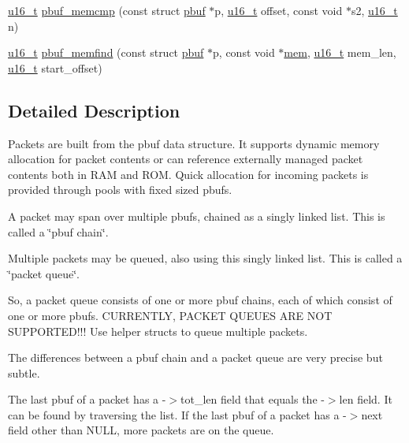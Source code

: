 \begin{DoxyCompactItemize}
\item 
\hyperlink{group__compiler__abstraction_ga77570ac4fcab86864fa1916e55676da2}{u16\+\_\+t} \hyperlink{group__pbuf_ga2170ccbbb13238380dbb203ee1b85974}{pbuf\+\_\+memcmp} (const struct \hyperlink{structpbuf}{pbuf} $\ast$p, \hyperlink{group__compiler__abstraction_ga77570ac4fcab86864fa1916e55676da2}{u16\+\_\+t} offset, const void $\ast$s2, \hyperlink{group__compiler__abstraction_ga77570ac4fcab86864fa1916e55676da2}{u16\+\_\+t} n)
\item 
\hyperlink{group__compiler__abstraction_ga77570ac4fcab86864fa1916e55676da2}{u16\+\_\+t} \hyperlink{group__pbuf_ga18c164a6e4a24d89ea9eb7571a886448}{pbuf\+\_\+memfind} (const struct \hyperlink{structpbuf}{pbuf} $\ast$p, const void $\ast$\hyperlink{structmem}{mem}, \hyperlink{group__compiler__abstraction_ga77570ac4fcab86864fa1916e55676da2}{u16\+\_\+t} mem\+\_\+len, \hyperlink{group__compiler__abstraction_ga77570ac4fcab86864fa1916e55676da2}{u16\+\_\+t} start\+\_\+offset)
\end{DoxyCompactItemize}


\subsection{Detailed Description}
Packets are built from the pbuf data structure. It supports dynamic memory allocation for packet contents or can reference externally managed packet contents both in R\+AM and R\+OM. Quick allocation for incoming packets is provided through pools with fixed sized pbufs.

A packet may span over multiple pbufs, chained as a singly linked list. This is called a \char`\"{}pbuf chain\char`\"{}.

Multiple packets may be queued, also using this singly linked list. This is called a \char`\"{}packet queue\char`\"{}.

So, a packet queue consists of one or more pbuf chains, each of which consist of one or more pbufs. C\+U\+R\+R\+E\+N\+T\+LY, P\+A\+C\+K\+ET Q\+U\+E\+U\+ES A\+RE N\+OT S\+U\+P\+P\+O\+R\+T\+E\+D!!! Use helper structs to queue multiple packets.

The differences between a pbuf chain and a packet queue are very precise but subtle.

The last pbuf of a packet has a -\/$>$tot\+\_\+len field that equals the -\/$>$len field. It can be found by traversing the list. If the last pbuf of a packet has a -\/$>$next field other than N\+U\+LL, more packets are on the queue.

